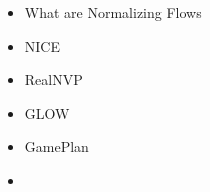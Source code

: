\begin{frame}
\begin{itemize}
    \item What are Normalizing Flows
    \item NICE
    \item RealNVP
    \item GLOW
    \item GamePlan
    \item \textbf{\color{red}{Results}}
\end{itemize}
\end{frame}
